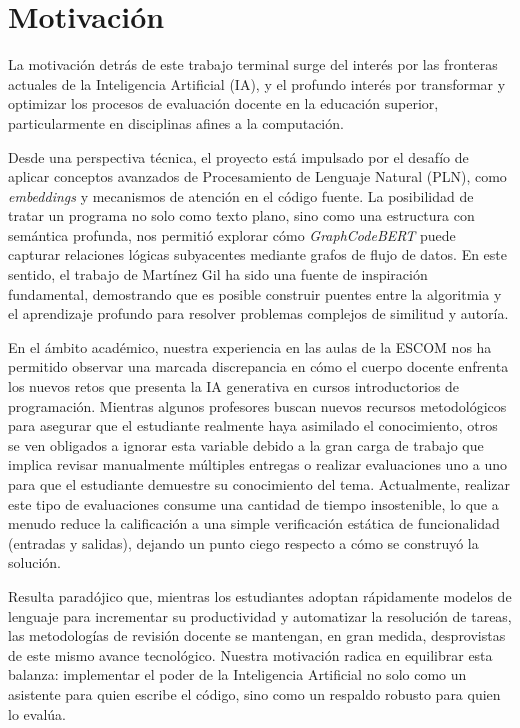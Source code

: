 \section{Motivación}

La motivación detrás de este trabajo terminal surge del interés por las fronteras actuales de la Inteligencia Artificial (IA), y el profundo interés por transformar y optimizar los procesos de evaluación docente en la educación superior, particularmente en disciplinas afines a la computación.

Desde una perspectiva técnica, el proyecto está impulsado por el desafío de aplicar conceptos avanzados de Procesamiento de Lenguaje Natural (PLN), como \textit{embeddings} y mecanismos de atención en el código fuente. La posibilidad de tratar un programa no solo como texto plano, sino como una estructura con semántica profunda, nos permitió explorar cómo \textit{GraphCodeBERT} puede capturar relaciones lógicas subyacentes mediante grafos de flujo de datos. En este sentido, el trabajo de Martínez Gil \cite{MartinezGil2026Improving} ha sido una fuente de inspiración fundamental, demostrando que es posible construir puentes entre la algoritmia y el aprendizaje profundo para resolver problemas complejos de similitud y autoría.

En el ámbito académico, nuestra experiencia en las aulas de la ESCOM nos ha permitido observar una marcada discrepancia en cómo el cuerpo docente enfrenta los nuevos retos que presenta la IA generativa en cursos introductorios de programación. Mientras algunos profesores buscan nuevos recursos metodológicos para asegurar que el estudiante realmente haya asimilado el conocimiento, otros se ven obligados a ignorar esta variable debido a la gran carga de trabajo que implica revisar manualmente múltiples entregas o realizar evaluaciones uno a uno para que el estudiante demuestre su conocimiento del tema. Actualmente, realizar este tipo de evaluaciones consume una cantidad de tiempo insostenible, lo que a menudo reduce la calificación a una simple verificación estática de funcionalidad (entradas y salidas), dejando un punto ciego respecto a cómo se construyó la solución.

Resulta paradójico que, mientras los estudiantes adoptan rápidamente modelos de lenguaje para incrementar su productividad y automatizar la resolución de tareas, las metodologías de revisión docente se mantengan, en gran medida, desprovistas de este mismo avance tecnológico. Nuestra motivación radica en equilibrar esta balanza: implementar el poder de la Inteligencia Artificial no solo como un asistente para quien escribe el código, sino como un respaldo robusto para quien lo evalúa.

